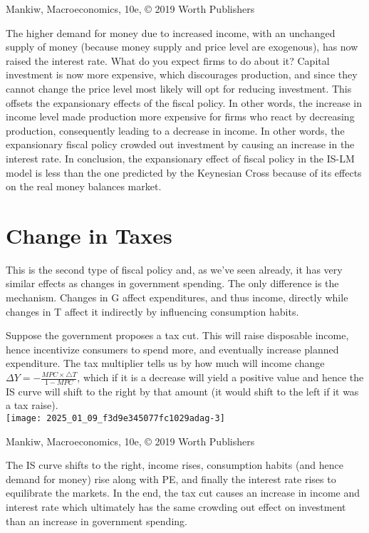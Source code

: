 \documentclass[10pt]{article}
\begin{document}
Mankiw, Macroeconomics, 10e, © 2019 Worth Publishers

The higher demand for money due to increased income, with an unchanged supply of money (because money supply and price level are exogenous), has now raised the interest rate. What do you expect firms to do about it? Capital investment is now more expensive, which discourages production, and since they cannot change the price level most likely will opt for reducing investment. This offsets the expansionary effects of the fiscal policy. In other words, the increase in income level made production more expensive for firms who react by decreasing production, consequently leading to a decrease in income. In other words, the expansionary fiscal policy crowded out investment by causing an increase in the interest rate. In conclusion, the expansionary effect of fiscal policy in the IS-LM model is less than the one predicted by the Keynesian Cross because of its effects on the real money balances market.

\section*{Change in Taxes}
This is the second type of fiscal policy and, as we've seen already, it has very similar effects as changes in government spending. The only difference is the mechanism. Changes in G affect expenditures, and thus income, directly while changes in T affect it indirectly by influencing consumption habits.

Suppose the government proposes a tax cut. This will raise disposable income, hence incentivize consumers to spend more, and eventually increase planned expenditure. The tax multiplier tells us by how much will income change $\Delta Y=-\frac{M P C \times \triangle T}{1-M P C}$, which if it is a decrease will yield a positive value and hence the IS curve will shift to the right by that amount (it would shift to the left if it was a tax raise).\\
\texttt{[image: 2025\_01\_09\_f3d9e345077fc1029adag-3]}

Mankiw, Macroeconomics, 10e, © 2019 Worth Publishers

The IS curve shifts to the right, income rises, consumption habits (and hence demand for money) rise along with PE, and finally the interest rate rises to equilibrate the markets. In the end, the tax cut causes an increase in income and interest rate which ultimately has the same crowding out effect on investment than an increase in government spending.
\end{document}

